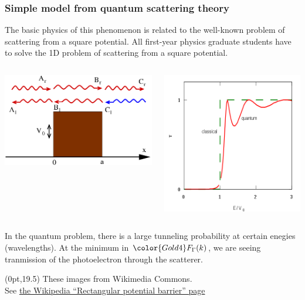 \documentclass[10pt, xcolor=x11names, compress]{beamer}
\begin{document}
\begin{frame}
  \frametitle{Simple model from quantum scattering theory}
  The basic physics of this phenomenon is related to the well-known
  problem of scattering from a square potential.  All first-year
  physics graduate students have to solve the 1D problem of scattering
  from a square potential.
  \begin{columns}[T]
    \begin{column}{0.6\linewidth}
      \centering\includegraphics[width=0.7\linewidth]{Finitepot.png}
    \end{column}
    \begin{column}{0.4\linewidth}
      \includegraphics[width=0.7\linewidth]{Finitebarrdiag.png}      
    \end{column}
  \end{columns}
  In the quantum problem, there is a large tunneling probability at
  certain enegies (wavelengths).  At the minimum in
  ${\color{Gold4}F_\Gamma(k)}$, we are seeing tranmission of the
  photoelectron through the scatterer.
  \begin{textblock*}{0.7\linewidth}(0pt,19.5\TPVertModule)%
    \tiny%
    These images from Wikimedia Commons.\\See
    \href{http://en.wikipedia.org/wiki/Rectangular_potential_barrier}
    {\color{Blue2}the Wikipedia ``Rectangular potential barrier'' page}
  \end{textblock*}
\end{frame}
\end{document}
